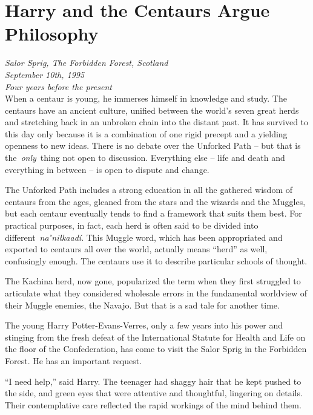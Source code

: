 \Startbonus

\hypertarget{harry-and-the-centaurs-argue-philosophy}{%
\chapter{Harry and the Centaurs Argue
Philosophy}\label{harry-and-the-centaurs-argue-philosophy}}

\emph{Salor Sprig, The Forbidden Forest, Scotland}\\
\emph{September 10th, 1995}\\
\emph{Four years before the present}\\

When a centaur is young, he immerses himself in knowledge and study. The
centaurs have an ancient culture, unified between the world's seven
great herds and stretching back in an unbroken chain into the distant
past. It has survived to this day only because it is a combination of
one rigid precept and a yielding openness to new ideas. There is no
debate over the Unforked Path -- but that is the~\emph{only}~thing not
open to discussion. Everything else -- life and death and everything in
between -- is open to dispute and change.

The Unforked Path includes a strong education in all the gathered wisdom
of centaurs from the ages, gleaned from the stars and the wizards and
the Muggles, but each centaur eventually tends to find a framework that
suits them best. For practical purposes, in fact, each herd is often
said to be divided into different~\emph{naʼniłkaadí}. This Muggle word,
which has been appropriated and exported to centaurs all over the world,
actually means ``herd'' as well, confusingly enough. The centaurs use it
to describe particular schools of thought.

The Kachina herd, now gone, popularized the term when they first
struggled to articulate what they considered wholesale errors in the
fundamental worldview of their Muggle enemies, the Navajo. But that is a
sad tale for another time.

The young Harry Potter-Evans-Verres, only a few years into his power and
stinging from the fresh defeat of the International Statute for Health
and Life on the floor of the Confederation, has come to visit the Salor
Sprig in the Forbidden Forest. He has an important request.

\mybreak

``I need help,'' said Harry. The teenager had shaggy hair that he kept
pushed to the side, and green eyes that were attentive and thoughtful,
lingering on details. Their contemplative care reflected the rapid
workings of the mind behind them.

